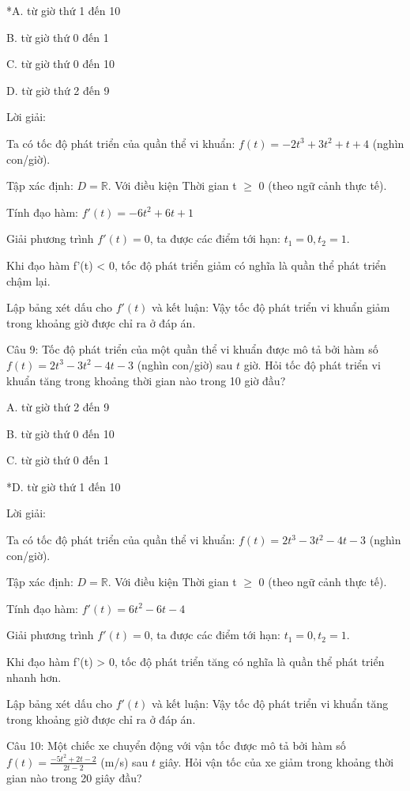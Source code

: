 \documentclass[a4paper,12pt]{article}
\begin{document}
*A. từ giờ thứ 1 đến 10

B. từ giờ thứ 0 đến 1

C. từ giờ thứ 0 đến 10

D. từ giờ thứ 2 đến 9

Lời giải:

Ta có tốc độ phát triển của quần thể vi khuẩn: \(f(t) = -2t^{3}+ 3t^{2}+ t+ 4\) (nghìn con/giờ).

Tập xác định: \(D = \mathbb{R}\).
Với điều kiện Thời gian t $\geq$ 0 (theo ngữ cảnh thực tế).

Tính đạo hàm:
\(f'(t) = -6t^{2}+ 6t+ 1\)

Giải phương trình \(f'(t) = 0\), ta được các điểm tới hạn:
\(t_1 = 0, t_2 = 1\).



Khi đạo hàm f'(t) < 0, tốc độ phát triển giảm có nghĩa là quần thể phát triển chậm lại.

Lập bảng xét dấu cho \(f'(t)\) và kết luận: Vậy tốc độ phát triển vi khuẩn giảm trong khoảng giờ được chỉ ra ở đáp án.



Câu 9: Tốc độ phát triển của một quần thể vi khuẩn được mô tả bởi hàm số \(f(t) = 2t^{3}- 3t^{2}- 4t- 3\) (nghìn con/giờ) sau \(t\) giờ. 
            Hỏi tốc độ phát triển vi khuẩn tăng trong khoảng thời gian nào trong 10 giờ đầu?

A. từ giờ thứ 2 đến 9

B. từ giờ thứ 0 đến 10

C. từ giờ thứ 0 đến 1

*D. từ giờ thứ 1 đến 10

Lời giải:

Ta có tốc độ phát triển của quần thể vi khuẩn: \(f(t) = 2t^{3}- 3t^{2}- 4t- 3\) (nghìn con/giờ).

Tập xác định: \(D = \mathbb{R}\).
Với điều kiện Thời gian t $\geq$ 0 (theo ngữ cảnh thực tế).

Tính đạo hàm:
\(f'(t) = 6t^{2}- 6t- 4\)

Giải phương trình \(f'(t) = 0\), ta được các điểm tới hạn:
\(t_1 = 0, t_2 = 1\).



Khi đạo hàm f'(t) > 0, tốc độ phát triển tăng có nghĩa là quần thể phát triển nhanh hơn.

Lập bảng xét dấu cho \(f'(t)\) và kết luận: Vậy tốc độ phát triển vi khuẩn tăng trong khoảng giờ được chỉ ra ở đáp án.



Câu 10: Một chiếc xe chuyển động với vận tốc được mô tả bởi hàm số \(f(t) = \frac{-5t^2+2t-2}{2t-2}\) (m/s) sau \(t\) giây. 
            Hỏi vận tốc của xe giảm trong khoảng thời gian nào trong 20 giây đầu?
\end{document}
